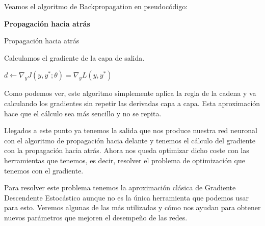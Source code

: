 Veamos el algoritmo de Backpropagation en pseudocódigo:

\begin{algorithm}[H]{\Large{\textbf{Propagación hacia atrás}}}
	
	\vspace{15px}
	
	\caption{Propagación hacia atrás}
	\label{alg:backpropagation}
	
	\vspace{10px}
	
	Calculamos el gradiente de la capa de salida.
	
	$d\leftarrow \nabla_y J(y,y^*;\theta) = \nabla_y L(y,y^*)$
	
	
	
	\vspace{5px}
\end{algorithm}

Como podemos ver, este algoritmo simplemente aplica la regla de la cadena y va calculando los gradientes sin repetir las derivadas capa a capa. Esta aproximación hace que el cálculo sea más sencillo y no se repita.

Llegados a este punto ya tenemos la salida que nos produce nuestra red neuronal con el algoritmo de propagación hacia delante y tenemos el cálculo del gradiente con la propagación hacia atrás. Ahora nos queda optimizar dicho coste con las herramientas que tenemos, es decir, resolver el problema de optimización que tenemos con el gradiente. 

Para resolver este problema tenemos la aproximación clásica de Gradiente Descendente Estocástico aunque no es la única herramienta que podemos usar para esto. Veremos algunas de las más utilizadas y cómo nos ayudan para obtener nuevos parámetros que mejoren el desempeño de las redes.


